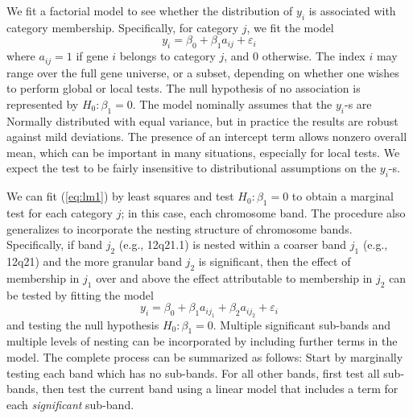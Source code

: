 \documentclass[11pt]{article}
\begin{document}
We fit a factorial model to see whether the distribution of $y_i$ is
associated with category membership.  Specifically, for category $j$,
we fit the model
\begin{equation}
  \label{eq:lm1}
  y_i = \beta_0 + \beta_1 a_{ij} + \varepsilon_{i}
\end{equation}
where $a_{ij} = 1$ if gene $i$ belongs to category $j$, and $0$
otherwise.  The index $i$ may range over the full gene universe, or a
subset, depending on whether one wishes to perform global or local
tests.  The null hypothesis of no association is represented by $H_0:
\beta_1 = 0$.  The model nominally assumes that the $y_i$-s are
Normally distributed with equal variance, but in practice the results
are robust against mild deviations.  The presence of an intercept term
allows nonzero overall mean, which can be important in many
situations, especially for local tests.  We expect the test to be
fairly insensitive to distributional assumptions on the $y_i$-s.


We can fit (\ref{eq:lm1}) by least squares and test $H_0: \beta_1 = 0$
to obtain a marginal test for each category $j$; in this case, each
chromosome band.  The procedure also generalizes to incorporate the
nesting structure of chromosome bands.  Specifically, if band $j_2$
(e.g., 12q21.1) is nested within a coarser band $j_1$ (e.g., 12q21)
and the more granular band $j_2$ is significant, then the effect of
membership in $j_1$ over and above the effect attributable to
membership in $j_2$ can be tested by fitting the model
\begin{equation}
  \label{eq:lm2}
  y_i = \beta_0 + \beta_1 a_{ij_1} + \beta_2 a_{ij_2} + \varepsilon_{i}
\end{equation}
and testing the null hypothesis $H_0: \beta_1 = 0$.  Multiple
significant sub-bands and multiple levels of nesting can be
incorporated by including further terms in the model.  The complete
process can be summarized as follows: Start by marginally testing each
band which has no sub-bands.  For all other bands, first test all
sub-bands, then test the current band using a linear model that
includes a term for each \emph{significant} sub-band.
\end{document}
